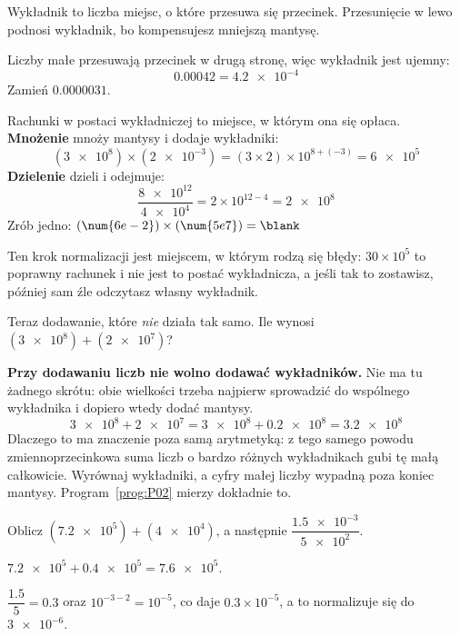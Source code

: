 \begin{fr}
Wykładnik to liczba miejsc, o które przesuwa się przecinek. Przesunięcie w lewo
podnosi wykładnik, bo kompensujesz mniejszą mantysę.

Liczby małe przesuwają przecinek w drugą stronę, więc wykładnik jest ujemny:
\[ \num{0.00042} = \num{4.2e-4} \]
Zamień $\num{0.0000031}$.
\nextframe
\end{fr}

\begin{fr}
Rachunki w postaci wykładniczej to miejsce, w którym ona się opłaca.
\textbf{Mnożenie} mnoży mantysy i dodaje wykładniki:
\[ (\num{3e8}) \times (\num{2e-3})
   = (3 \times 2) \times 10^{8 + (-3)} = \num{6e5} \]
\textbf{Dzielenie} dzieli i odejmuje:
\[ \frac{\num{8e12}}{\num{4e4}} = 2 \times 10^{12-4} = \num{2e8} \]
Zrób jedno: $(\num{6e-2}) \times (\num{5e7}) = \blank$
\nextframe
\end{fr}

\begin{fr}
Ten krok normalizacji jest miejscem, w którym rodzą się błędy: $30 \times
10^{5}$ to poprawny rachunek i nie jest to postać wykładnicza, a jeśli tak to
zostawisz, później sam źle odczytasz własny wykładnik.

Teraz dodawanie, które \emph{nie} działa tak samo. Ile wynosi
$(\num{3e8}) + (\num{2e7})$?
\nextframe
\end{fr}

\begin{fr}
\begin{trapbox}
\textbf{Przy dodawaniu liczb nie wolno dodawać wykładników.} Nie ma tu żadnego
skrótu: obie wielkości trzeba najpierw sprowadzić do wspólnego wykładnika i
dopiero wtedy dodać mantysy.
\[ \num{3e8} + \num{2e7} = \num{3e8} + \num{0.2e8} = \num{3.2e8} \]
Dlaczego to ma znaczenie poza samą arytmetyką: z tego samego powodu
zmiennoprzecinkowa suma liczb o bardzo różnych wykładnikach gubi tę małą
całkowicie. Wyrównaj wykładniki, a cyfry małej liczby wypadną poza koniec
mantysy. Program~\ref{prog:P02} mierzy dokładnie to.
\end{trapbox}

\yourturn
Oblicz $(\num{7.2e5}) + (\num{4e4})$, a następnie
$\dfrac{\num{1.5e-3}}{\num{5e2}}$.
\dotline
\nextframe
\end{fr}

\begin{fr}
\begin{ansblock}
$\num{7.2e5} + \num{0.4e5} = \num{7.6e5}$.

$\dfrac{\num{1.5}}{5} = \num{0.3}$ oraz $10^{-3-2} = 10^{-5}$, co daje
$\num{0.3} \times 10^{-5}$, a to normalizuje się do $\num{3e-6}$.
\end{ansblock}
\end{fr}

